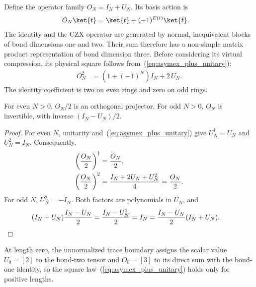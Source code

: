 Define the operator family $O_N=I_N+U_N$. Its basis action is
\begin{align}
    O_N\ket{t} & =\ket{t}+(-1)^{E(t)}\ket{\bar t}.
    \label{eq:asymex_plus_action}
\end{align}
The identity and the CZX operator are generated by normal, inequivalent
blocks of bond dimensions one and two. Their sum therefore has a
non-simple matrix product representation of bond dimension three.
Before considering its virtual compression, its physical square follows
from~(\ref{eq:asymex_plus_unitary}):
\begin{align}
    O_N^2 & =(1+(-1)^N)I_N+2\,U_N.
    \label{eq:asymex_czx_plus_square}
\end{align}
The identity coefficient is two on even rings and zero on odd rings.

\begin{lemma}
    \label{lem:asymex_plus_parity}
    For even $N>0$, $O_N/2$ is an orthogonal projector. For odd $N>0$,
    $O_N$ is invertible, with inverse $(I_N-U_N)/2$.
\end{lemma}

\begin{proof}
    For even $N$, unitarity and~(\ref{eq:asymex_plus_unitary}) give
    $U_N^\dagger=U_N$ and $U_N^2=I_N$. Consequently,
    \begin{align}
        \left(\frac{O_N}{2}\right)^\dagger & =\frac{O_N}{2},
        \notag                                                                        \\
        \left(\frac{O_N}{2}\right)^2
                                           & =\frac{I_N+2U_N+U_N^2}{4}=\frac{O_N}{2}.
        \notag
    \end{align}
    For odd $N$, $U_N^2=-I_N$. Both factors are polynomials in $U_N$, and
    \begin{align}
        (I_N+U_N)\frac{I_N-U_N}{2}
         & =\frac{I_N-U_N^2}{2}
        =I_N
        =\frac{I_N-U_N}{2}(I_N+U_N).
        \notag
    \end{align}
\end{proof}

At length zero, the unnormalized trace boundary assigns the scalar value
$U_0=[2]$ to the bond-two tensor and $O_0=[3]$ to its direct sum with the
bond-one identity, so the square law~(\ref{eq:asymex_plus_unitary}) holds only
for positive lengths.

